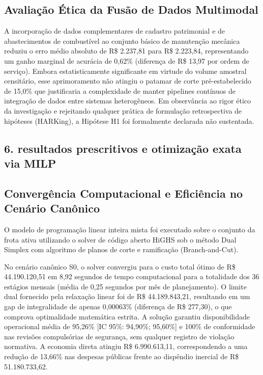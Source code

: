 \documentclass[12pt,a4paper]{article}
\begin{document}
\subsection{Avaliação Ética da Fusão de Dados Multimodal}

A incorporação de dados complementares de cadastro patrimonial e de abastecimentos de combustível ao conjunto básico de manutenção mecânica reduziu o erro médio absoluto de R\$ 2.237,81 para R\$ 2.223,84, representando um ganho marginal de acurácia de 0,62\% (diferença de R\$ 13,97 por ordem de serviço). Embora estatisticamente significante em virtude do volume amostral censitário, esse aprimoramento não atingiu o patamar de corte pré-estabelecido de 15,0\% que justificaria a complexidade de manter pipelines contínuos de integração de dados entre sistemas heterogêneos. Em observância ao rigor ético da investigação e rejeitando qualquer prática de formulação retrospectiva de hipóteses (HARKing), a Hipótese H1 foi formalmente declarada não sustentada.


\subsection{6. resultados prescritivos e otimização exata via MILP}


\subsection{Convergência Computacional e Eficiência no Cenário Canônico}

O modelo de programação linear inteira mista foi executado sobre o conjunto da frota ativa utilizando o solver de código aberto HiGHS sob o método Dual Simplex com algoritmo de planos de corte e ramificação (Branch-and-Cut).

No cenário canônico S0, o solver convergiu para o custo total ótimo de R\$ 44.190.120,51 em 8,92 segundos de tempo computacional para a totalidade dos 36 estágios mensais (média de 0,25 segundos por mês de planejamento). O limite dual fornecido pela relaxação linear foi de R\$ 44.189.843,21, resultando em um gap de integralidade de apenas 0,00063\% (diferença de R\$ 277,30), o que comprova optimalidade matemática estrita. A solução garantiu disponibilidade operacional média de 95,26\% [IC 95\%: 94,90\%; 95,60\%] e 100\% de conformidade nas revisões compulsórias de segurança, sem qualquer registro de violação normativa. A economia direta atingiu R\$ 6.990.613,11, correspondendo a uma redução de 13,66\% nas despesas públicas frente ao dispêndio inercial de R\$ 51.180.733,62.
\end{document}
